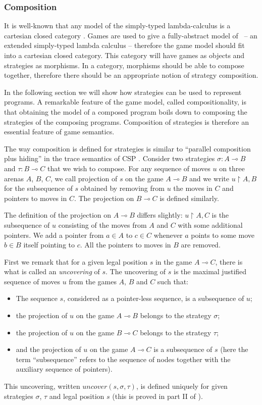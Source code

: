 \subsubsection{Composition}

It is well-known that any model of the simply-typed lambda-calculus
is a cartesian closed category \citep{CroleRL:catt}. Games are used
to give a fully-abstract model of \pcf\ -- an extended simply-typed
lambda calculus -- therefore the game model should fit into a
cartesian closed category. This category will have games as objects
and strategies as morphisms. In a category, morphisms should be able
to compose together, therefore there should be an appropriate notion
of strategy composition.

In the following section we will show how strategies can be used to
represent programs. A remarkable feature of the game model, called
compositionality, is that obtaining the model of a composed program
boils down to composing the strategies of the composing programs.
Composition of strategies is therefore an essential feature of game
semantics.


The way composition is defined for strategies is similar to
``parallel composition plus hiding'' in the trace semantics of CSP
\citep{hoare_csp}. Consider two strategies $\sigma : A \multimap B$
and $\tau : B \multimap C$ that we wish to compose. For any sequence
of moves $u$ on three arenas $A$, $B$, $C$, we call projection of
$s$ on the game $A \multimap B$ and we write $u \upharpoonright A,B$
for the subsequence of $s$ obtained by removing from $u$ the moves
in $C$ and pointers to moves in $C$. The projection on $B \multimap
C$ is defined similarly.

The definition of the projection on $A \multimap B$ differs
slightly: $u \upharpoonright A,C$ is the subsequence of $u$
consisting of the moves from $A$ and $C$ with some additional
pointers. We add a pointer from $a \in A$ to $c\in C$ whenever $a$
points to some move $b \in B$ itself pointing to $c$. All the
pointers to moves in $B$ are removed.


First we remark that for a given legal position $s$ in the game $A
\multimap C$, there is what is called an \emph{uncovering} of $s$.
The uncovering of $s$ is the maximal justified sequence of moves $u$
from the games $A$, $B$ and $C$ such that:
\begin{itemize}
\item The sequence $s$, considered as a pointer-less sequence, is a subsequence of
$u$;
\item the projection of $u$ on the game $A \multimap B$ belongs to the
strategy $\sigma$;
\item the projection of $u$ on the game $B \multimap C$ belongs
to the strategy $\tau$;
\item and the projection of $u$ on the game $A \multimap C$ is a subsequence of $s$ (here the term ``subsequence'' refers to the sequence of nodes together with the auxiliary sequence of pointers).
\end{itemize}
This uncovering, written $uncover(s, \sigma, \tau)$, is
defined uniquely for given strategies $\sigma$, $\tau$ and legal
position $s$ (this is proved in part II of \cite{hylandong_pcf}).

